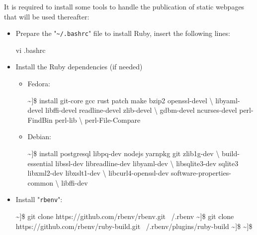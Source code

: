 It is required to install some tools to handle the publication of static webpages that will be used thereafter:
\begin{itemize}
\item Prepare the "\texttt{\textasciitilde/.bashrc}" file to install Ruby, insert the following lines:
\begin{scripti}
\fprompt{~} vi .bashrc
 \bad{=}
 \bad{=}
 \bad{=}
 
 \bad{=}
\end{scripti}
\item Install the Ruby dependencies (if needed)
\begin{itemize}
\item Fedora:
\vspace{-0.25cm}
{\footnotesize{
\begin{scriptii}
\textasciitilde]\$   install git-core gcc rust patch make bzip2 openssl-devel \textbackslash
                      libyaml-devel libffi-devel readline-devel zlib-devel \textbackslash
                      gdbm-devel ncurses-devel perl-FindBin perl-lib \textbackslash
                      perl-File-Compare
\end{scriptii}
}}
\item Debian:
\vspace{-0.25cm}
{\footnotesize{
\begin{scriptii}
\textasciitilde]\$   install postgresql libpq-dev nodejs yarnpkg git zlib1g-dev \textbackslash
                      build-essential libssl-dev libreadline-dev libyaml-dev \textbackslash
                      libsqlite3-dev sqlite3 libxml2-dev libxslt1-dev \textbackslash
                      libcurl4-openssl-dev software-properties-common \textbackslash
                      libffi-dev
\end{scriptii}
}}
\end{itemize}
\item Install "\texttt{rbenv}":
{\footnotesize{
\begin{scripti}
\textasciitilde]\$ git clone https://github.com/rbenv/rbenv.git ~/.rbenv
\textasciitilde]\$ git clone https://github.com/rbenv/ruby-build.git ~/.rbenv/plugins/ruby-build
\textasciitilde]\$   
\textasciitilde]\$   

\end{scripti}}}
\end{itemize}
